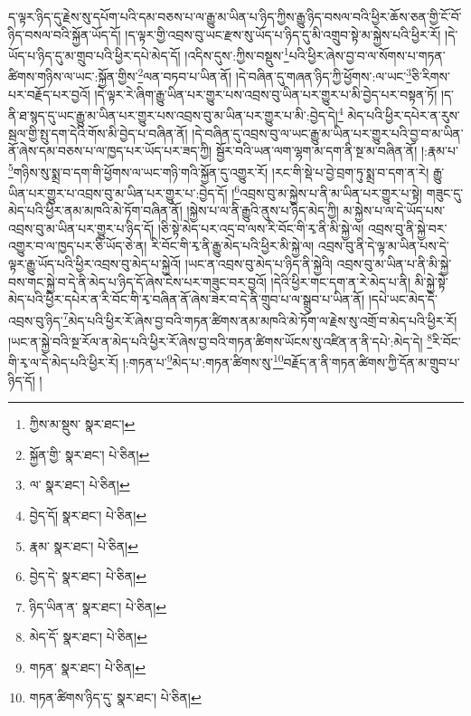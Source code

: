 ད་ལྟར་ཉིད་དུ་རྗེས་སུ་དཔོག་པའི་དམ་བཅས་པ་ལ་རྒྱུ་མ་ཡིན་པ་ཉིད་ཀྱིས་རྒྱུ་ཉིད་བསལ་བའི་ཕྱིར་ཆོས་ཅན་གྱི་ངོ་བོ་ཉིད་བསལ་བའི་སྐྱོན་ཡོད་དོ། །ད་ལྟར་གྱི་འབྲས་བུ་ཡང་རྫས་སུ་ཡོད་པ་ཉིད་དུ་མི་འགྲུབ་སྟེ་མ་སྐྱེས་པའི་ཕྱིར་རོ། །དེ་ཡོད་པ་ཉིད་དུ་མ་གྲུབ་པའི་ཕྱིར་དཔེ་མེད་དོ། །འདིས་དུས་:ཀྱིས་བསྡུས་\footnote{ཀྱིས་མ་སྡུས་  སྣར་ཐང་། }པའི་ཕྱིར་ཞེས་བྱ་བ་ལ་སོགས་པ་གཏན་ཚིགས་གཉིས་ལ་ཡང་:སྐྱོན་གྱིས་\footnote{སྐྱོན་གྱི་  སྣར་ཐང་།  པེ་ཅིན། }ལན་བཏབ་པ་ཡིན་ནོ། །དེ་བཞིན་དུ་གཞན་ཉིད་ཀྱི་ཕྱོགས་:ལ་ཡང་\footnote{ལ་  སྣར་ཐང་།  པེ་ཅིན། }ཅི་རིགས་པར་བརྗོད་པར་བྱའོ། །དེ་ལྟར་རེ་ཞིག་རྒྱུ་ཡིན་པར་གྱུར་པས་འབྲས་བུ་ཡིན་པར་གྱུར་པ་མི་བྱེད་པར་བསྟན་ཏོ། །ད་ནི་ཐ་སྙད་དུ་ཡང་རྒྱུ་མ་ཡིན་པར་གྱུར་པས་འབྲས་བུ་མ་ཡིན་པར་གྱུར་པ་མི་:བྱེད་དེ།\footnote{བྱེད་དོ།  སྣར་ཐང་།  པེ་ཅིན། } མེད་པའི་ཕྱིར་དཔེར་ན་རུས་སྦལ་གྱི་སྤུ་དག་དེའི་གོས་མི་བྱེད་པ་བཞིན་ནོ། །དེ་བཞིན་དུ་འབྲས་བུ་ལ་ཡང་རྒྱུ་མ་ཡིན་པར་གྱུར་པའི་བྱ་བ་མ་ཡིན་ནོ་ཞེས་དམ་བཅས་པ་ལ་ཁྱད་པར་ཡོད་པར་ཟད་ཀྱི། སྦྱོར་བའི་ཡན་ལག་ལྷག་མ་དག་ནི་སྔ་མ་བཞིན་ནོ། །:རྣམ་པ་\footnote{རྣམ་  སྣར་ཐང་།  པེ་ཅིན། }གཉིས་སུ་སྨྲ་བ་དག་གི་ཕྱོགས་ལ་ཡང་གཉི་གའི་སྐྱོན་དུ་འགྱུར་རོ། །རང་གི་སྡེ་པ་བྱེ་བྲག་ཏུ་སྨྲ་བ་དག་ན་རེ། རྒྱུ་ཡིན་པར་གྱུར་པ་འབྲས་བུ་མ་ཡིན་པར་གྱུར་པ་:བྱེད་དོ། །\footnote{བྱེད་དེ་  སྣར་ཐང་།  པེ་ཅིན། }འབྲས་བུ་མ་སྐྱེས་པ་ནི་མ་ཡིན་པར་གྱུར་པ་སྟེ། གཟུང་དུ་མེད་པའི་ཕྱིར་ནམ་མཁའི་མེ་ཏོག་བཞིན་ནོ། །སྐྱེས་པ་ལ་ནི་རྒྱུའི་ནུས་པ་ཉིད་མེད་ཀྱི། མ་སྐྱེས་པ་ལ་དེ་ཡོད་པས་འབྲས་བུ་མ་ཡིན་པར་གྱུར་པ་ཉིད་དོ། །ཅི་སྟེ་མེད་པར་འདྲ་བ་ལས་རི་བོང་གི་རྭ་ནི་མི་སྐྱེ་ལ། འབྲས་བུ་ནི་སྐྱེ་བར་འགྱུར་བ་ལ་ཁྱད་པར་ཅི་ཡོད་ཅེ་ན། རི་བོང་གི་རྭ་ནི་རྒྱུ་མེད་པའི་ཕྱིར་མི་སྐྱེ་ལ། འབྲས་བུ་ནི་དེ་ལྟ་མ་ཡིན་པས་དེ་ལྟར་རྒྱུ་ཡོད་པའི་ཕྱིར་འབྲས་བུ་མེད་པ་སྐྱེའོ། །ཡང་ན་འབྲས་བུ་མེད་པ་ཉིད་ནི་སྐྱེའི། འབྲས་བུ་མ་ཡིན་པ་ནི་མི་སྐྱེ་བས་གང་སྐྱེ་བ་དེ་ནི་མེད་པ་ཉིད་དོ་ཞེས་ངེས་པར་གཟུང་བར་བྱའོ། །དེའི་ཕྱིར་གང་དག་ན་རེ་མེད་པ་ནི། མི་སྐྱེ་སྟེ་མེད་པའི་ཕྱིར་དཔེར་ན་རི་བོང་གི་རྭ་བཞིན་ནོ་ཞེས་ཟེར་བ་དེ་ནི་གྲུབ་པ་ལ་སྒྲུབ་པ་ཡིན་ནོ། །དཔེ་ཡང་མེད་དེ་འབྲས་བུ་ཉིད་\footnote{ཉིད་ཡིན་ན་  སྣར་ཐང་།  པེ་ཅིན། }མེད་པའི་ཕྱིར་རོ་ཞེས་བྱ་བའི་གཏན་ཚིགས་ནམ་མཁའི་མེ་ཏོག་ལ་རྗེས་སུ་འགྲོ་བ་མེད་པའི་ཕྱིར་རོ། །ཡང་ན་སྐྱེ་བའི་སྔ་རོལ་ན་མེད་པའི་ཕྱིར་རོ་ཞེས་བྱ་བའི་གཏན་ཚིགས་ཡོངས་སུ་འཛིན་ན་ནི་དཔེ་:མེད་དེ། \footnote{མེད་དོ་  སྣར་ཐང་།  པེ་ཅིན། }རི་བོང་གི་རྭ་ལ་དེ་མེད་པའི་ཕྱིར་རོ། །:གཏན་པ་\footnote{གཏན་  སྣར་ཐང་།  པེ་ཅིན། }མེད་པ་:གཏན་ཚིགས་སུ་\footnote{གཏན་ཚིགས་ཉིད་དུ་  སྣར་ཐང་།  པེ་ཅིན། }བརྗོད་ན་ནི་གཏན་ཚིགས་ཀྱི་དོན་མ་གྲུབ་པ་ཉིད་དོ། །
